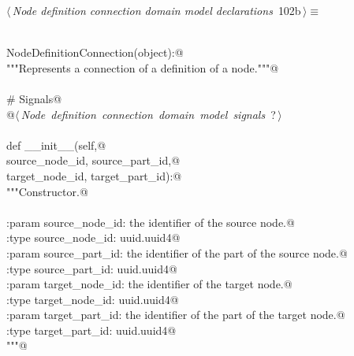 \documentclass[
    a4paper,      %
    10pt,         %
    openright,    %
    notitlepage,  %
    parskip=half, %
]{scrreprt}       %
\theoremstyle{definition}                    %
\begin{document}
\begin{flushleft} \small
\begin{minipage}{\linewidth}\label{scrap166}\raggedright\small
{} $\langle\,${\itshape Node definition connection domain model declarations}\nobreak\ {\footnotesize {102b}}$\,\rangle\equiv$
\vspace{-1exm}
\begin{list}{}{} \item
\mbox{}\lstinline@@\\
\mbox{}\lstinline@class NodeDefinitionConnection(object):@\\
\mbox{}\lstinline@    """Represents a connection of a definition of a node."""@\\
\mbox{}\lstinline@@\\
\mbox{}\lstinline@    # Signals@\\
\mbox{}\lstinline@    @\hbox{$\langle\,${\itshape Node definition connection domain model signals}\nobreak\ {\footnotesize ?}$\,\rangle$}\lstinline@@\\
\mbox{}\lstinline@@\\
\mbox{}\lstinline@    def __init__(self,@\\
\mbox{}\lstinline@                 source_node_id, source_part_id,@\\
\mbox{}\lstinline@                 target_node_id, target_part_id):@\\
\mbox{}\lstinline@        """Constructor.@\\
\mbox{}\lstinline@@\\
\mbox{}\lstinline@        :param source_node_id: the identifier of the source node.@\\
\mbox{}\lstinline@        :type  source_node_id: uuid.uuid4@\\
\mbox{}\lstinline@        :param source_part_id: the identifier of the part of the source node.@\\
\mbox{}\lstinline@        :type  source_part_id: uuid.uuid4@\\
\mbox{}\lstinline@        :param target_node_id: the identifier of the target node.@\\
\mbox{}\lstinline@        :type  target_node_id: uuid.uuid4@\\
\mbox{}\lstinline@        :param target_part_id: the identifier of the part of the target node.@\\
\mbox{}\lstinline@        :type  target_part_id: uuid.uuid4@\\
\mbox{}\lstinline@        """@\\

\end{list}
\end{minipage}
\end{flushleft}
\end{document}
